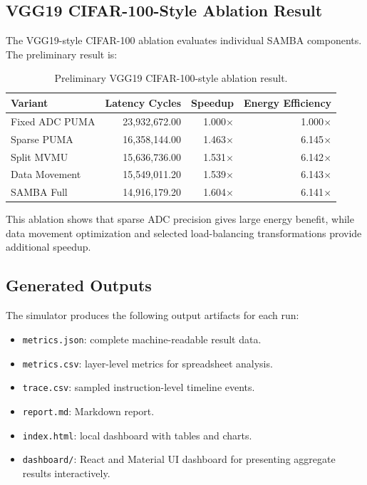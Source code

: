 \documentclass[11pt]{article}
\begin{document}
\subsection{VGG19 CIFAR-100-Style Ablation Result}

The VGG19-style CIFAR-100 ablation evaluates individual SAMBA components. The preliminary result is:

\begin{table}[H]
\centering
\caption{Preliminary VGG19 CIFAR-100-style ablation result.}
\begin{tabular}{lrrr}
\toprule
\textbf{Variant} & \textbf{Latency Cycles} & \textbf{Speedup} & \textbf{Energy Efficiency} \\
\midrule
Fixed ADC PUMA & 23,932,672.00 & 1.000$\times$ & 1.000$\times$ \\
Sparse PUMA & 16,358,144.00 & 1.463$\times$ & 6.145$\times$ \\
Split MVMU & 15,636,736.00 & 1.531$\times$ & 6.142$\times$ \\
Data Movement & 15,549,011.20 & 1.539$\times$ & 6.143$\times$ \\
SAMBA Full & 14,916,179.20 & 1.604$\times$ & 6.141$\times$ \\
\bottomrule
\end{tabular}
\end{table}

This ablation shows that sparse ADC precision gives large energy benefit, while data movement optimization and selected load-balancing transformations provide additional speedup.

\subsection{Generated Outputs}

The simulator produces the following output artifacts for each run:

\begin{itemize}
    \item \texttt{metrics.json}: complete machine-readable result data.
    \item \texttt{metrics.csv}: layer-level metrics for spreadsheet analysis.
    \item \texttt{trace.csv}: sampled instruction-level timeline events.
    \item \texttt{report.md}: Markdown report.
    \item \texttt{index.html}: local dashboard with tables and charts.
    \item \texttt{dashboard/}: React and Material UI dashboard for presenting aggregate results interactively.
\end{itemize}
\end{document}
